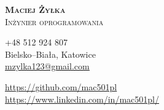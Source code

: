 \documentclass[A4,11pt]{article}
\begin{document}
\textbf{\Huge \scshape{Maciej Żyłka}} \\ 
{\Large \scshape{Inżynier oprogramowania}} \\ \vspace{5pt} 
\begin{minipage}[c]{0.4\textwidth}
    \faPhone \tab +48 512 924 807\\
    \faMapMarker \tab Bielsko--Biała, Katowice\\
    \faEnvelopeO \tab \href{mailto:mzylka123@gmail.com}{\underline{mzylka123@gmail.com}}\\
\end{minipage}
\begin{minipage}[c]{0.4\textwidth}
    \faGithub \tab \href{https://github.com/mac501pl}{\underline{https://github.com/mac501pl}} \\
    \faLinkedinSquare \tab \href{https://www.linkedin.com/in/mac501pl/}{\underline{https://www.linkedin.com/in/mac501pl/}} \\
\end{minipage}
\end{document}
